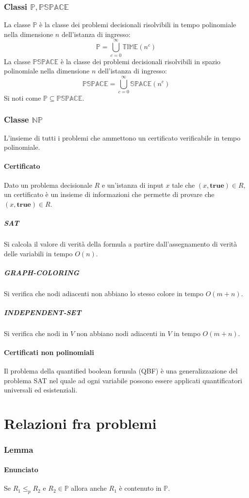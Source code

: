 \subsubsection{Classi $\mathbf{\mathbb{P}}, \mathbf{\mathbb{PSPACE}}$}
La classe $\mathbb{P}$ \`e la classe dei problemi decisionali risolvibili in tempo polinomiale nella dimensione $n$ dell'istanza di ingresso:
$$\mathbb{P} = \bigcup\limits_{c=0}^\infty\mathbb{TIME}(n^c)$$
La classe $\mathbb{PSPACE}$ \`e la classe dei problemi decisionali risolvibili in spazio polinomiale nella dimensione $n$ dell'istanza di ingresso:
$$\mathbb{PSPACE}=\bigcup\limits_{c=0}^\infty\mathbb{SPACE}(n^c)$$
Si noti come $\mathbb{P}\subseteq\mathbb{PSPACE}$.
\subsubsection{Classe $\mathbf{\mathbb{NP}}$}
L'insieme di tutti i problemi che ammettono un certificato verificabile in tempo polinomiale.
\paragraph{Certificato}
Dato un problema decisionale $R$ e un'istanza di input $x$ tale che $(x, \mathbf{true})\in R$, un certificato \`e un insieme di informazioni che permette di provare che $(x, 
\mathbf{true})\in R$.
\subparagraph{SAT}
Si calcola il valore di verit\`a della formula a partire dall'assegnamento di verit\`a delle variabili in tempo $O(n)$.
\subparagraph{GRAPH-COLORING}
Si verifica che nodi adiacenti non abbiano lo stesso colore in tempo $O(m+n)$.
\subparagraph{INDEPENDENT-SET}	
Si verifica che nodi in $V$ non abbiano nodi adiacenti in $V$ in tempo $O(m+n)$.
\paragraph{Certificati non polinomiali}
Il problema della quantified boolean formula (QBF) \`e una generalizzazione del problema SAT nel quale ad ogni variabile possono essere applicati quantificatori universali ed 
esistenziali.
\section{Relazioni fra problemi}
\subsubsection{Lemma}
\paragraph{Enunciato}
Se $R_1\le_p R_2$ e $R_2\in\mathbb{P}$ allora anche $R_1$ \`e contenuto in $\mathbb{P}$.
